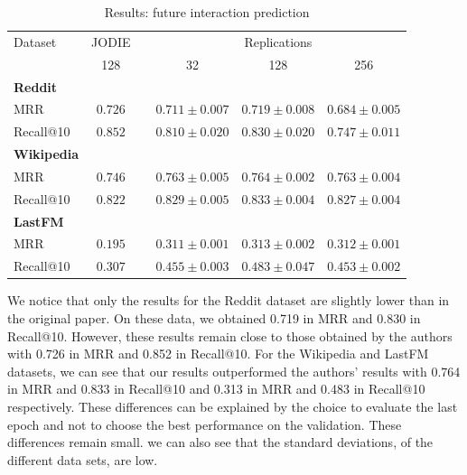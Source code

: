 \begin{table}[H]
    \centering
    \begin{tabular}{@{}lccccc@{}}
    \toprule
    Dataset\hspace*{3em} & JODIE & \phantom{abc} & \multicolumn{3}{c}{Replications} \\
    \cmidrule{2-2} \cmidrule{4-6}
    & 128 && \multicolumn{1}{c}{32} & \multicolumn{1}{c}{128} & \multicolumn{1}{c}{256} \\
    \midrule
    \multicolumn{1}{l}{\hspace{-0.2cm}\textbf{Reddit}} \\
    {\quad \small MRR} & $\boldsymbol{0.726}$  && $0.711 \pm 0.007$ & $0.719 \pm 0.008$ & $0.684 \pm 0.005$ \\
    {\quad\small Recall@10}  &$\boldsymbol{0.852}$ && $0.810 \pm 0.020$ & $0.830 \pm 0.020$ & $0.747 \pm 0.011$\\
    \multicolumn{1}{l}{\hspace{-0.2cm}\textbf{Wikipedia}}\\
    {\quad\small MRR} &$0.746$ && $\boldsymbol{0.763} \pm 0.005$ & $\boldsymbol{0.764} \pm 0.002$ & $\boldsymbol{0.763} \pm 0.004$  \\
    {\quad\small Recall@10}  & $0.822$ && $\boldsymbol{0.829} \pm 0.005$ & $\boldsymbol{0.833} \pm 0.004$ & $\boldsymbol{0.827} \pm 0.004$\\
    \multicolumn{1}{l}{\hspace{-0.2cm}\textbf{LastFM}} \\
    {\quad\small MRR} &$0.195$ && $\boldsymbol{0.311} \pm 0.001$ & $\boldsymbol{0.313} \pm 0.002$ & $\boldsymbol{0.312} \pm 0.001$ \\
    {\quad\small Recall@10}  & $0.307$ && $\boldsymbol{0.455} \pm 0.003$ & $\boldsymbol{0.483} \pm 0.047$ & $\boldsymbol{0.453} \pm 0.002$\\
    \bottomrule
    \end{tabular}
    \caption{Results: future interaction prediction}
\end{table}

We notice that only the results for the Reddit dataset are slightly lower than in the original paper. On these data, we obtained 0.719 in MRR and 0.830 in Recall@10. However, these results remain close to those obtained by the authors with 0.726 in MRR and 0.852 in Recall@10. For the Wikipedia and LastFM datasets, we can see that our results outperformed the authors' results with 0.764 in MRR and 0.833 in Recall@10 and 0.313 in MRR and 0.483 in Recall@10 respectively. These differences can be explained by the choice to evaluate the last epoch and not to choose the best performance on the validation. These differences remain small. we can also see that the standard deviations, of the different data sets, are low.\\

